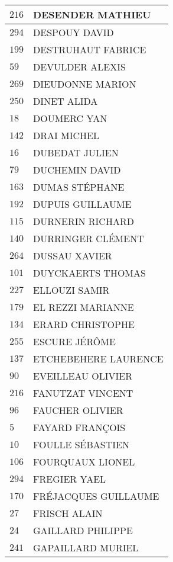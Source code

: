 \begin{xltabular}{\linewidth}{|l|X|}
    \hline
    $216$ & DESENDER MATHIEU \\
    \hline
    $294$ & DESPOUY DAVID \\
    \hline
    $199$ & DESTRUHAUT FABRICE \\
    \hline
    $59$ & DEVULDER ALEXIS \\
    \hline
    $269$ & DIEUDONNE MARION \\
    \hline
    $250$ & DINET ALIDA \\
    \hline
    $18$ & DOUMERC YAN \\
    \hline
    $142$ & DRAI MICHEL \\
    \hline
    $16$ & DUBEDAT JULIEN \\
    \hline
    $79$ & DUCHEMIN DAVID \\
    \hline
    $163$ & DUMAS STÉPHANE \\
    \hline
    $192$ & DUPUIS GUILLAUME \\
    \hline
    $115$ & DURNERIN RICHARD \\
    \hline
    $140$ & DURRINGER CLÉMENT \\
    \hline
    $264$ & DUSSAU XAVIER \\
    \hline
    $101$ & DUYCKAERTS THOMAS \\
    \hline
    $227$ & ELLOUZI SAMIR \\
    \hline
    $179$ & EL REZZI MARIANNE \\
    \hline
    $134$ & ERARD CHRISTOPHE \\
    \hline
    $255$ & ESCURE JÉRÔME \\
    \hline
    $137$ & ETCHEBEHERE LAURENCE \\
    \hline
    $90$ & EVEILLEAU OLIVIER \\
    \hline
    $216$ & FANUTZAT VINCENT \\
    \hline
    $96$ & FAUCHER OLIVIER \\
    \hline
    $5$ & FAYARD FRANÇOIS \\
    \hline
    $10$ & FOULLE SÉBASTIEN \\
    \hline
    $106$ & FOURQUAUX LIONEL \\
    \hline
    $294$ & FREGIER YAEL \\
    \hline
    $170$ & FRÉJACQUES GUILLAUME \\
    \hline
    $27$ & FRISCH ALAIN \\
    \hline
    $24$ & GAILLARD PHILIPPE \\
    \hline
    $241$ & GAPAILLARD MURIEL \\

\end{xltabular}
